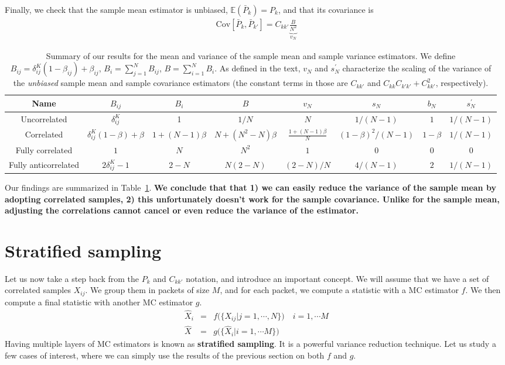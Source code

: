 \documentclass{aastex6}
\newcommand{\eqn}[1]{\begin{eqnarray}#1\end{eqnarray}}
\begin{document}
Finally, we check that the sample mean estimator is unbiased, $\mathbb{E}(\bar{P}_k) = P_k$, and that its covariance is
\eqn{
	\mathrm{Cov}[\bar{P}_k, \bar{P}_{k'}] = C_{kk'} \underbrace{ \frac{B}{N^2} }_{v_N}
}

\begin{table}\centering
\begin{tabular}{|c|c|c|c|c|c|c|c|}
	\hline	Name	& $B_{ij}$	&	$B_{i}$	&	$B$	&	$v_N$	&	$s_N $ 	&	$b_N$	&	$s_N^\prime$	\\\hline
	Uncorrelated	&$ \delta^K_{ij}$		&	1	&	$1/N$	&	$N$	&	$1/(N-1)$	&	$1$	&	$1/(N-1)$	\\
	Correlated	&$\delta^K_{ij}(1-\beta) + \beta$		&	$1 + (N-1)\beta$	&	$N + (N^2-N)\beta$	&	$\frac{1 + (N-1)\beta}{N}$	&	$(1-\beta)^2/(N-1)$	&	$1-\beta$	&	$1/(N-1)$	\\
	Fully correlated	&$ 1$		&	$N$	&	$N^2$	&	$1$	&	$0$	&$0$		&	$0$	\\
	Fully anticorrelated	&$2 \delta^K_{ij} - 1$		&	$2-N$	&	$N(2-N)$	&	$(2-N)/N$	&	$4/(N-1)$	&	$2$	&	$1/(N-1)$	\\
	\hline
\end{tabular}	
\caption{Summary of our results for the mean and variance of the sample mean and sample variance estimators. We define $B_{ij} =  \delta^K_{ij}(1-\beta_{ij}) + \beta_{ij}$, $B_i=\sum_{j=1}^NB_{ij}$, $B=\sum_{i=1}^NB_{i}$. As defined in the text, $v_N$ and $s_N^\prime$ characterize the scaling of the variance of the \textit{unbiased} sample mean and sample covariance estimators (the constant terms in those are $C_{kk'}$ and $C_{kk}C_{k'k'} + C_{kk'}^2$, respectively). 
}
\label{table:correlateddrawbiasesandvariances}
\end{table}
 
Our findings are summarized in Table~\ref{table:correlateddrawbiasesandvariances}. \textbf{We conclude that that 1) we can easily reduce the variance of the sample mean by adopting correlated samples, 2) this unfortunately doesn't work for the sample covariance. Unlike for the sample mean, adjusting the correlations cannot cancel or even reduce the variance of the estimator.}

\section{Stratified sampling}

Let us now take a step back from the $P_k$ and $C_{kk'}$ notation, and introduce an important concept. 
We will assume that we have a set of correlated samples $X_{ij}$. 
We group them in packets of size $M$, and for each packet, we compute a statistic with a MC estimator $f$. 
We then compute a final statistic with another MC estimator $g$. 
\eqn{
	\hat{X}_i &=& f\bigl(\{X_{ij} | j=1, \cdots, N\}\bigr) \quad i=1, \cdots M \\
	\hat{X} &=& g\bigl(\{\hat{X}_i | i=1, \cdots M\}\bigr)
}
Having multiple layers of MC estimators is known as \textbf{stratified sampling}. It is a powerful variance reduction technique.
Let us study a few cases of interest, where we can simply use the results of the previous section on both $f$ and $g$.
\end{document}
